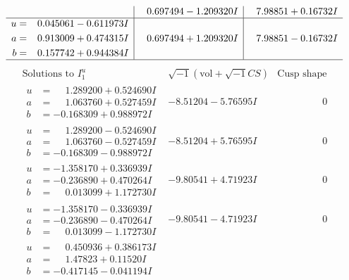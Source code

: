 \documentclass[1p]{elsarticle_modified}
\theoremstyle{definition}
\newcommand{\I}{\sqrt{-1}}
\begin{document}
$$\begin{array}{c|c|c}
 & \phantom{-}0.697494 - 1.209320 I & \phantom{-}7.98851 + 0.16732 I \\ \hline\begin{aligned}
u &= \phantom{-}0.045061 - 0.611973 I \\
a &= \phantom{-}0.913009 + 0.474315 I \\
b &= \phantom{-}0.157742 + 0.944384 I\end{aligned}
 & \phantom{-}0.697494 + 1.209320 I & \phantom{-}7.98851 - 0.16732 I\\
 \hline 
 \end{array}$$\newpage$$\begin{array}{c|c|c}  
\text{Solutions to }I^u_{1}& \I (\text{vol} + \sqrt{-1}CS) & \text{Cusp shape}\\
 \hline 
\begin{aligned}
u &= \phantom{-}1.289200 + 0.524690 I \\
a &= \phantom{-}1.063760 + 0.527459 I \\
b &= -0.168309 + 0.988972 I\end{aligned}
 & -8.51204 - 5.76595 I & \phantom{-0.000000 } 0 \\ \hline\begin{aligned}
u &= \phantom{-}1.289200 - 0.524690 I \\
a &= \phantom{-}1.063760 - 0.527459 I \\
b &= -0.168309 - 0.988972 I\end{aligned}
 & -8.51204 + 5.76595 I & \phantom{-0.000000 } 0 \\ \hline\begin{aligned}
u &= -1.358170 + 0.336939 I \\
a &= -0.236890 + 0.470264 I \\
b &= \phantom{-}0.013099 + 1.172730 I\end{aligned}
 & -9.80541 + 4.71923 I & \phantom{-0.000000 } 0 \\ \hline\begin{aligned}
u &= -1.358170 - 0.336939 I \\
a &= -0.236890 - 0.470264 I \\
b &= \phantom{-}0.013099 - 1.172730 I\end{aligned}
 & -9.80541 - 4.71923 I & \phantom{-0.000000 } 0 \\ \hline\begin{aligned}
u &= \phantom{-}0.450936 + 0.386173 I \\
a &= \phantom{-}1.47823 + 0.11520 I \\
b &= -0.417145 - 0.041194 I\end{aligned}

\end{array}$$
\end{document}
